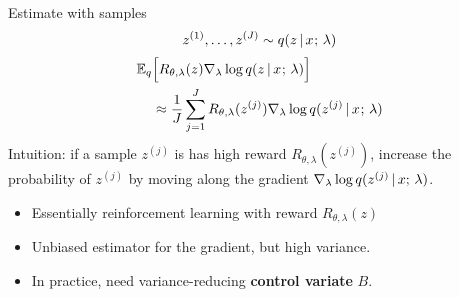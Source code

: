 \begin{frame}
Estimate with samples 
\[ z^{(1)}, \dots, z^{(J)} \sim q(z \,|\, x^{} ; \, \lambda) \]
\begin{align*}
        \mathbb{E}_{q}&\Big[ R_{\theta, \lambda}(z)  \nabla_\lambda \log q(z \,|\, x^{} ; \, \lambda) \Big] \\ &\approx \frac{1}{J}\sum_{j=1}^J R_{\theta, \lambda}(z^{(j)})  \nabla_\lambda \log q(z^{(j)} \,|\, x^{} ; \, \lambda)
\end{align*}
Intuition: if a sample $z^{(j)}$ is has high reward $R_{\theta, \lambda}(z^{(j)})$,
increase the probability of $z^{(j)}$
by moving along the gradient $\nabla_\lambda \log q(z^{(j)} \,|\, x ; \, \lambda)$.
\end{frame}

\begin{frame}
\begin{itemize}
    \item Essentially reinforcement learning with reward $R_{\theta, \lambda}(z)$
    \item Unbiased estimator for the gradient, but high variance.
    \item In practice, need variance-reducing \textbf{control variate} $B$.
\end{itemize}    
\end{frame}

